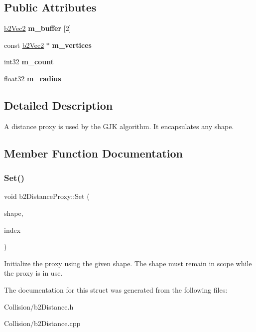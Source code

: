 \subsection*{Public Attributes}
\begin{DoxyCompactItemize}
\item 
\mbox{\label{structb2DistanceProxy_a3fc5ebfa3d34ac66390b88f9277fb330}} 
\mbox{\hyperlink{structb2Vec2}{b2\+Vec2}} {\bfseries m\+\_\+buffer} \mbox{[}2\mbox{]}
\item 
\mbox{\label{structb2DistanceProxy_abaf1495b8214b74d944b57170a762f32}} 
const \mbox{\hyperlink{structb2Vec2}{b2\+Vec2}} $\ast$ {\bfseries m\+\_\+vertices}
\item 
\mbox{\label{structb2DistanceProxy_ae36efab1361bb1f94e32f9b956c6f1b3}} 
int32 {\bfseries m\+\_\+count}
\item 
\mbox{\label{structb2DistanceProxy_a459c93f35b1e62d583bd73d8c478ce89}} 
float32 {\bfseries m\+\_\+radius}
\end{DoxyCompactItemize}


\subsection{Detailed Description}
A distance proxy is used by the G\+JK algorithm. It encapsulates any shape. 

\subsection{Member Function Documentation}
\mbox{\label{structb2DistanceProxy_a80a59a9c9e952482a8fc6db4b883365d}} 
\subsubsection{\texorpdfstring{Set()}{Set()}}
{\footnotesize\ttfamily void b2\+Distance\+Proxy\+::\+Set (\begin{DoxyParamCaption}\item[{const \mbox{\hyperlink{classb2Shape}{b2\+Shape}} $\ast$}]{shape,  }\item[{int32}]{index }\end{DoxyParamCaption})}

Initialize the proxy using the given shape. The shape must remain in scope while the proxy is in use. 

The documentation for this struct was generated from the following files\+:\begin{DoxyCompactItemize}
\item 
Collision/b2\+Distance.\+h\item 
Collision/b2\+Distance.\+cpp\end{DoxyCompactItemize}
